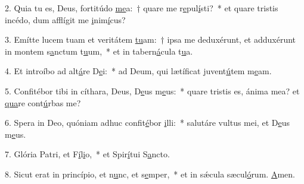 2. Quia tu es, Deus, fortitúdo \uline{me}a:~† quare me r\uline{e}pul\uline{í}sti?~* et quare tristis incédo, dum afflígit me \uline{i}nim\uline{í}cus?\par 
3. Emítte lucem tuam et veritátem \uline{tu}am:~† ipsa me deduxérunt, et adduxérunt in montem s\uline{a}nctum t\uline{u}um,~* et in tabern\uline{á}cula t\uline{u}a.\par 
4. Et introíbo ad alt\uline{á}re D\uline{e}i:~* ad Deum, qui lætíficat juvent\uline{ú}tem m\uline{e}am.\par 
5. Confitébor tibi in cíthara, Deus, D\uline{e}us m\uline{e}us:~* quare tristis es, ánima mea? et \uline{qua}re cont\uline{ú}rbas me?\par 
6. Spera in Deo, quóniam adhuc confit\uline{é}bor \uline{i}lli:~* salutáre vultus mei, et D\uline{e}us m\uline{e}us.\par 
7. Glória Patri, et F\uline{í}l\uline{i}o,~* et Spir\uline{í}tui S\uline{a}ncto.\par 
8. Sicut erat in princípio, et n\uline{u}nc, et s\uline{e}mper,~* et in sǽcula sæcul\uline{ó}rum. \uline{A}men.\par 

